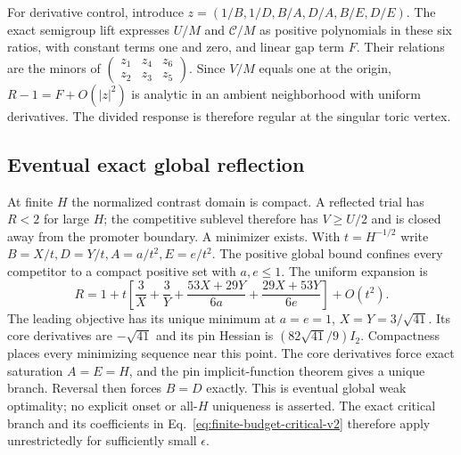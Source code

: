 \documentclass[aps,pre,reprint,amsmath,amssymb,longbibliography]{revtex4-2}
\begin{document}
For derivative control, introduce
$z=(1/B,1/D,B/A,D/A,B/E,D/E)$. The exact semigroup lift expresses $U/M$
and $\mathcal C/M$ as positive polynomials in these six ratios, with constant terms
one and zero, and linear gap term $F$. Their relations are the minors of
$\left(\begin{smallmatrix}z_1&z_4&z_6\\z_2&z_3&z_5\end{smallmatrix}\right)$.
Since $V/M$ equals one at the origin, $R-1=F+O(|z|^2)$ is analytic in an
ambient neighborhood with uniform derivatives. The divided response is
therefore regular at the singular toric vertex.

\subsection{Eventual exact global reflection}
\label{v3-app-exact-global-reflection}
At finite $H$ the normalized contrast domain is compact. A reflected trial
has $R<2$ for large $H$; the competitive sublevel therefore has $V\geq U/2$
and is closed away from the promoter boundary. A minimizer exists. With
$t=H^{-1/2}$ write $B=X/t,D=Y/t,A=a/t^2,E=e/t^2$. The positive global
bound confines every competitor to a compact positive set with $a,e\leq1$.
The uniform expansion is
\begin{equation}
 R=1+t\left[\frac3X+\frac3Y+
       \frac{53X+29Y}{6a}+\frac{29X+53Y}{6e}\right]+O(t^2).
\end{equation}
The leading objective has its unique minimum at
$a=e=1$, $X=Y=3/\sqrt{41}$. Its core derivatives are $-\sqrt{41}$ and
its pin Hessian is $(82\sqrt{41}/9)I_2$. Compactness places every minimizing
sequence near this point. The core derivatives force exact saturation
$A=E=H$, and the pin implicit-function theorem gives a unique branch.
Reversal then forces $B=D$ exactly. This is eventual global weak optimality;
no explicit onset or all-$H$ uniqueness is asserted. The exact critical
branch and its coefficients in Eq.~\eqref{eq:finite-budget-critical-v2}
therefore apply unrestrictedly for sufficiently small $\epsilon$.
\end{document}
